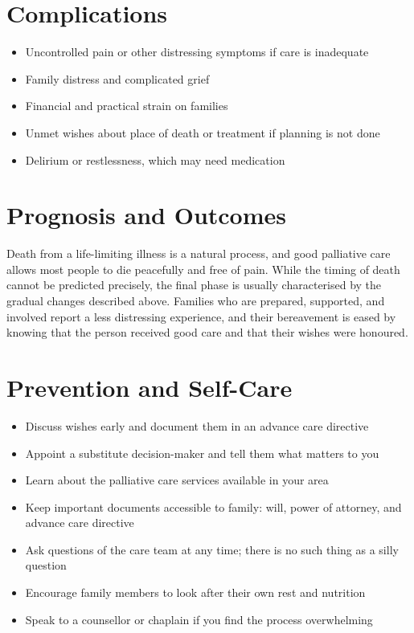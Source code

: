 \section*{Complications}
\begin{itemize}
    \item Uncontrolled pain or other distressing symptoms if care is inadequate
    \item Family distress and complicated grief
    \item Financial and practical strain on families
    \item Unmet wishes about place of death or treatment if planning is not done
    \item Delirium or restlessness, which may need medication
\end{itemize}

\section*{Prognosis and Outcomes}
Death from a life-limiting illness is a natural process, and good palliative care allows most people to die peacefully and free of pain. While the timing of death cannot be predicted precisely, the final phase is usually characterised by the gradual changes described above. Families who are prepared, supported, and involved report a less distressing experience, and their bereavement is eased by knowing that the person received good care and that their wishes were honoured.

\section*{Prevention and Self-Care}
\begin{itemize}
    \item Discuss wishes early and document them in an advance care directive
    \item Appoint a substitute decision-maker and tell them what matters to you
    \item Learn about the palliative care services available in your area
    \item Keep important documents accessible to family: will, power of attorney, and advance care directive
    \item Ask questions of the care team at any time; there is no such thing as a silly question
    \item Encourage family members to look after their own rest and nutrition
    \item Speak to a counsellor or chaplain if you find the process overwhelming
\end{itemize}

